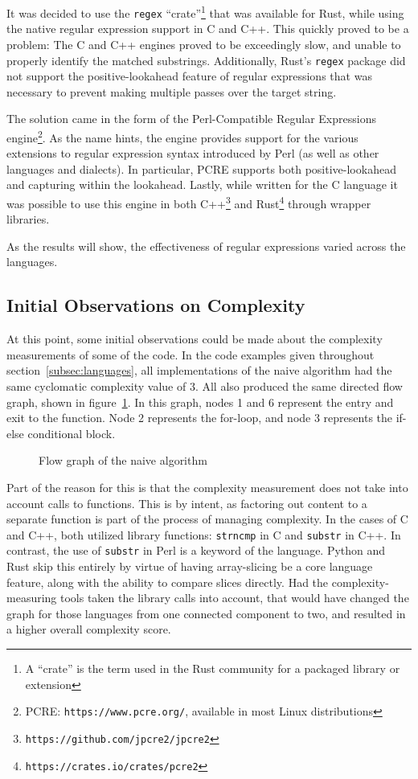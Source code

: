 It was decided to use the \texttt{regex} ``crate''\footnote{A ``crate'' is the term used in the Rust community for a packaged library or extension} that was available for Rust, while using the native regular expression support in C and C++. This quickly proved to be a problem: The C and C++ engines proved to be exceedingly slow, and unable to properly identify the matched substrings. Additionally, Rust's \texttt{regex} package did not support the positive-lookahead feature of regular expressions that was necessary to prevent making multiple passes over the target string.

The solution came in the form of the Perl-Compatible Regular Expressions engine\footnote{PCRE: \texttt{https://www.pcre.org/}, available in most Linux distributions}. As the name hints, the engine provides support for the various extensions to regular expression syntax introduced by Perl (as well as other languages and dialects). In particular, PCRE supports both positive-lookahead and capturing within the lookahead. Lastly, while written for the C language it was possible to use this engine in both C++\footnote{\texttt{https://github.com/jpcre2/jpcre2}} and Rust\footnote{\texttt{https://crates.io/crates/pcre2}} through wrapper libraries.

As the results will show, the effectiveness of regular expressions varied across the languages.

\subsection{Initial Observations on Complexity}

At this point, some initial observations could be made about the complexity measurements of some of the code. In the code examples given throughout section~\ref{subsec:languages}, all implementations of the naive algorithm had the same cyclomatic complexity value of 3. All also produced the same directed flow graph, shown in figure~\ref{fig:graph-naive}. In this graph, nodes 1 and 6 represent the entry and exit to the function. Node 2 represents the for-loop, and node 3 represents the if-else conditional block.

\begin{figure}[ht]
\centering

\caption{Flow graph of the naive algorithm}
\label{fig:graph-naive}
\end{figure}

Part of the reason for this is that the complexity measurement does not take into account calls to functions. This is by intent, as factoring out content to a separate function is part of the process of managing complexity. In the cases of C and C++, both utilized library functions: \texttt{strncmp} in C and \texttt{substr} in C++. In contrast, the use of \texttt{substr} in Perl is a keyword of the language. Python and Rust skip this entirely by virtue of having array-slicing be a core language feature, along with the ability to compare slices directly. Had the complexity-measuring tools taken the library calls into account, that would have changed the graph for those languages from one connected component to two, and resulted in a higher overall complexity score.

